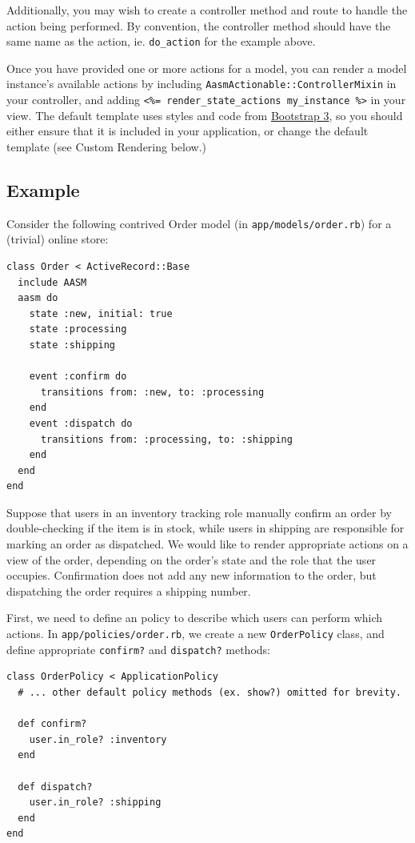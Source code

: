 \documentclass[document.tex]{subfiles}
\begin{document}
Additionally, you may wish to create a controller method and route to handle the action being performed. By convention, the controller method should have the same name as the action, ie. {\tt do\_action} for the example above.

Once you have provided one or more actions for a model, you can render a model instance's available actions by including {\tt AasmActionable::ControllerMixin} in your controller, and adding {\tt \textless{}\%= render\_state\_actions my\_instance \%\textgreater{}} in your view. The default template uses styles and code from \href{http://getbootstrap.com/}{Bootstrap 3}, so you should either ensure that it is included in your application, or change the default template (see Custom Rendering below.) 

\subsection{Example}

Consider the following contrived Order model (in {\tt app/models/order.rb}) for a (trivial) online store:

\begin{lstlisting}
class Order < ActiveRecord::Base
  include AASM
  aasm do
    state :new, initial: true
    state :processing
    state :shipping

    event :confirm do
      transitions from: :new, to: :processing
    end
    event :dispatch do
      transitions from: :processing, to: :shipping
    end
  end
end

\end{lstlisting}   %

Suppose that users in an inventory tracking role manually confirm an order by double-checking if the item is in stock, while users in shipping are responsible for marking an order as dispatched. We would like to render appropriate actions on a view of the order, depending on the order's state and the role that the user occupies. Confirmation does not add any new information to the order, but dispatching the order requires a shipping number.

First, we need to define an policy to describe which users can perform which actions. In {\tt app/policies/order.rb}, we create a new {\tt OrderPolicy} class, and define appropriate {\tt confirm?} and {\tt dispatch?} methods:

\begin{lstlisting}
class OrderPolicy < ApplicationPolicy
  # ... other default policy methods (ex. show?) omitted for brevity.

  def confirm?
    user.in_role? :inventory
  end

  def dispatch?
    user.in_role? :shipping
  end
end

\end{lstlisting}   %
\end{document}
